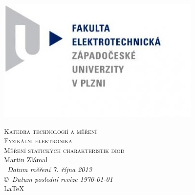 \documentclass[12pt]{article} %
\newcommand{\bigsize}{\fontsize{35pt}{20pt}\selectfont}
\begin{document}
\begin{titlepage}
	\includegraphics[scale=0.7]{logo.jpg}
	\vspace*{\fill}
	\begin{center}
		\textsc{\LARGE Katedra technologií a měření}\\[0.3cm]
		\textsc{\LARGE \bigsize Fyzikální elektronika}\\[0.3cm]
		\textsc{\LARGE Měření statických charakteristik diod}\\[1cm]
		Martin Zlámal \\[1cm]
		{\small\em \ Datum měření 7. října 2013 } \\
		{\small\em \copyright \ Datum poslední revize \today } \\
		\LaTeX
	\end{center}
	\vspace*{\fill}
\end{titlepage}
\tableofcontents
\listoffigures
\listoftables
\newpage
\end{document}
